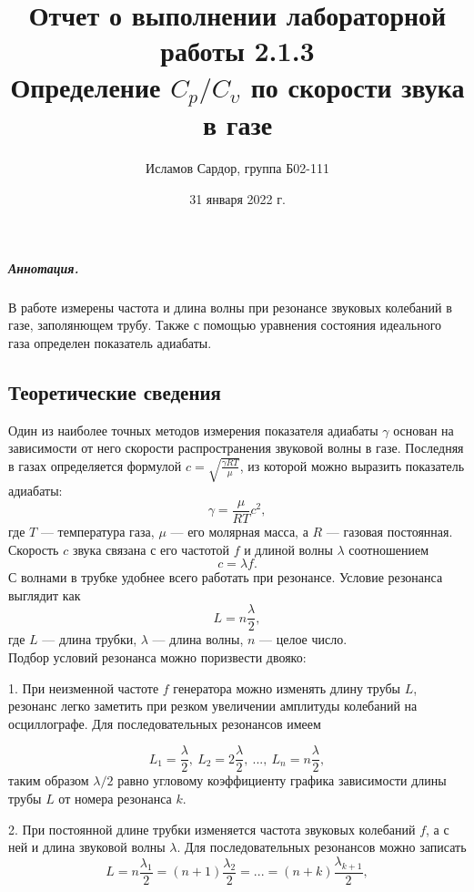 \documentclass[12pt,a4paper]{article}
\title{
Отчет о выполнении лабораторной работы 2.1.3 \\
Определение $C_p/C_\upsilon$ по скорости звука в газе
}
\author{Исламов Сардор, группа Б02-111}
\date{31 января 2022 г. }
\begin{document}
\maketitle

\subparagraph*{Аннотация.}

В работе измерены частота и длина волны при резонансе звуковых колебаний в газе, заполянющем трубу. Также с помощью уравнения состояния идеального газа определен показатель адиабаты.

\subsection*{Теоретические сведения}

Один из наиболее точных методов измерения показателя адиабаты $\gamma$ основан на зависимости от него скорости распространения звуковой волны в газе. Последняя в газах определяется формулой $c = \sqrt{\frac{\gamma RT}{\mu}}$, из которой можно выразить показатель адиабаты:
 	\begin{equation}
 	\gamma = \frac{\mu}{RT}c^2,
 	\end{equation}
где $T$ --- температура газа, $\mu$ --- его молярная масса, а $R$ --- газовая постоянная. \\
Скорость $c$ звука связана с его частотой $f$ и длиной волны $\lambda$ соотношением
	\begin{equation}
	c = \lambda f.
	\end{equation}
С волнами в трубке удобнее всего работать при резонансе. Условие резонанса выглядит как
	\begin{equation}
	L = n\frac{\lambda}{2},
	\end{equation}
где $L$ --- длина трубки, $\lambda$ --- длина волны, $n$ --- целое число.\\
Подбор условий резонанса можно поризвести двояко:

1. При неизменной частоте $f$ генератора можно изменять длину трубы $L$, резонанс легко заметить при резком увеличении амплитуды колебаний на осциллографе. Для последовательных резонансов имеем

\begin{equation*}
    L_1 = \frac \lambda 2 ,\ L_{2} = 2 \frac \lambda 2,\ ...,\ L_n = n \frac{\lambda}{2},
\end{equation*}
таким образом $\lambda/2$ равно угловому коэффициенту графика зависимости длины трубы $L$ от номера резонанса $k$.

2. При постоянной длине трубки изменяется частота звуковых колебаний $f$, а с ней и длина звуковой волны $\lambda$. Для последовательных резонансов можно записать
	\begin{equation*}
	L = n\frac{\lambda_1}{2} = (n + 1)\frac{\lambda_2}{2} = ... = (n + k)\frac{\lambda_{k + 1}}{2},
	\end{equation*}
\end{document}
